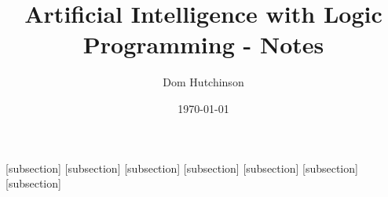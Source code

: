 \documentclass[11pt,a4paper]{article}
\begin{document}
\pagestyle{fancy}
\setlength\parindent{0pt}
\allowdisplaybreaks

\renewcommand{\headrulewidth}{0pt}

\title{Artificial Intelligence with Logic Programming - Notes}
\author{Dom Hutchinson}
\date{\today}
\maketitle

\fancyhead[R]{\today}

[subsection]
[subsection]
[subsection]
[subsection]
[subsection]
[subsection]
[subsection]

\newcommand{\dotprod}[0]{\boldsymbol{\cdot}}
\newcommand{\cosech}[0]{\mathrm{cosech}\ }
\newcommand{\cosec}[0]{\mathrm{cosec}\ }
\newcommand{\sech}[0]{\mathrm{sech}\ }
\newcommand{\prob}[0]{\mathbb{P}}
\newcommand{\nats}[0]{\mathbb{N}}
\newcommand{\cov}[0]{\mathrm{Cov}}
\newcommand{\var}[0]{\mathrm{Var}}
\newcommand{\expect}[0]{\mathbb{E}}
\newcommand{\reals}[0]{\mathbb{R}}
\newcommand{\integers}[0]{\mathbb{Z}}
\newcommand{\indicator}[0]{\mathds{1}}
\newcommand{\nb}[0]{\textit{N.B.} }
\newcommand{\ie}[0]{\textit{i.e.} }
\newcommand{\eg}[0]{\textit{e.g.} }
\newcommand{\X}[0]{\textbf{X}}
\newcommand{\x}[0]{\textbf{x}}
\newcommand{\iid}[0]{\overset{\text{iid}}{\sim}}
\newcommand{\proved}[0]{$\hfill\square$\\}
\newcommand{\LL}[0]{\mathcal{L}}
\end{document}
